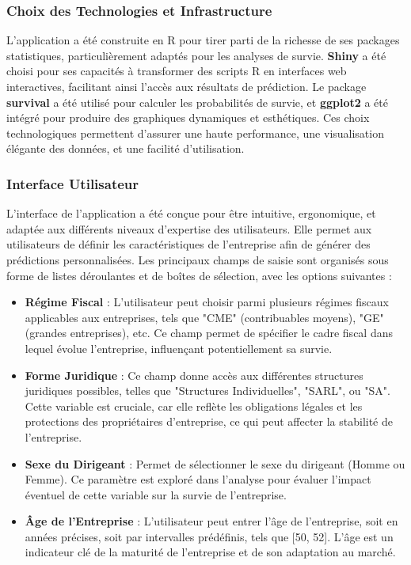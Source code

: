\documentclass[a4paper,12pt]{report}
\begin{document}
\subsubsection{Choix des Technologies et Infrastructure}

L'application a été construite en R pour tirer parti de la richesse de ses packages statistiques, particulièrement adaptés pour les analyses de survie. \textbf{Shiny} a été choisi pour ses capacités à transformer des scripts R en interfaces web interactives, facilitant ainsi l'accès aux résultats de prédiction. Le package \textbf{survival} a été utilisé pour calculer les probabilités de survie, et \textbf{ggplot2} a été intégré pour produire des graphiques dynamiques et esthétiques. Ces choix technologiques permettent d'assurer une haute performance, une visualisation élégante des données, et une facilité d'utilisation.

\subsubsection{Interface Utilisateur}

L'interface de l'application a été conçue pour être intuitive, ergonomique, et adaptée aux différents niveaux d'expertise des utilisateurs. Elle permet aux utilisateurs de définir les caractéristiques de l'entreprise afin de générer des prédictions personnalisées. Les principaux champs de saisie sont organisés sous forme de listes déroulantes et de boîtes de sélection, avec les options suivantes :

\begin{itemize}
    \item \textbf{Régime Fiscal} : L'utilisateur peut choisir parmi plusieurs régimes fiscaux applicables aux entreprises, tels que "CME" (contribuables moyens), "GE" (grandes entreprises), etc. Ce champ permet de spécifier le cadre fiscal dans lequel évolue l'entreprise, influençant potentiellement sa survie.
    \item \textbf{Forme Juridique} : Ce champ donne accès aux différentes structures juridiques possibles, telles que "Structures Individuelles", "SARL", ou "SA". Cette variable est cruciale, car elle reflète les obligations légales et les protections des propriétaires d'entreprise, ce qui peut affecter la stabilité de l’entreprise.
    \item \textbf{Sexe du Dirigeant} : Permet de sélectionner le sexe du dirigeant (Homme ou Femme). Ce paramètre est exploré dans l'analyse pour évaluer l'impact éventuel de cette variable sur la survie de l'entreprise.
    \item \textbf{Âge de l'Entreprise} : L'utilisateur peut entrer l'âge de l'entreprise, soit en années précises, soit par intervalles prédéfinis, tels que [50, 52]. L'âge est un indicateur clé de la maturité de l’entreprise et de son adaptation au marché.
\end{itemize}
\end{document}
